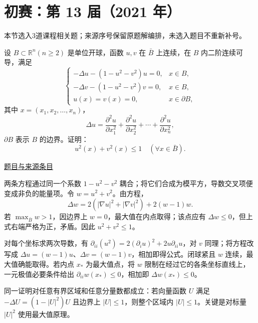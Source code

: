 \documentclass[UTF8,12pt,a4paper,fontset=fandol]{ctexart}
\begin{document}
\section{初赛：第 13 届（2021 年）}

本节选入3道课程相关题；来源序号保留原题解编排，未选入题目不重新补号。

\begin{example}[来源序号2]\label{ex:ch07-13th-A:2}\label{pr:ch07-13th-A:2}

设 $B\subset\mathbb R^{n}(n\geq 2)$ 是单位开球，函数 $u,v$ 在 $\bar{B}$ 上连续，在 $B$ 内二阶连续可导，满足
\[
\begin{cases}-\Delta u-\left(1-u^{2}-v^{2}\right)u=0, & x\in B,\\ -\Delta v-\left(1-u^{2}-v^{2}\right)v=0, & x\in B,\\ u(x)=v(x)=0, & x\in\partial B,\end{cases}
\]
其中 $x=\left(x_{1},x_{2},\ldots,x_{n}\right)$，
\[
\Delta u=\frac{\partial^{2}u}{\partial x_{1}^{2}}+\frac{\partial^{2}u}{\partial x_{2}^{2}}+\cdots+\frac{\partial^{2}u}{\partial x_{n}^{2}},
\]
$\partial B$ 表示 $B$ 的边界。证明：
\[
u^{2}(x)+v^{2}(x)\leq 1\quad(\forall x\in\bar{B}).
\]

\par\href{https://github.com/lzxcr/cmc-mathematics/blob/64916fa1fdbc3e444a652eca204d5669058ee321/src/problems/preliminary/13/02.md}{题目与来源条目}

\end{example}

\begin{solve}\label{ans:ch07-13th-A:2}

两条方程通过同一个系数 $1-u^2-v^2$ 耦合；将它们合成为模平方，导数交叉项便变成非负的能量项。令 $w=u^2+v^2$。由方程，
\[
\Delta w=2(|\nabla u|^2+|\nabla v|^2)+2(w-1)w.
\]
若 $\max_{\bar B}w>1$，因边界上 $w=0$，最大值在内点取得；该点应有 $\Delta w\leq0$，但上式右端严格为正，矛盾。因此 $u^2+v^2\leq1$。

对每个坐标求两次导数，有 $\partial_{ii}(u^2)=2(\partial_i u)^2+2u\partial_{ii}u$，对 $v$ 同理；将方程改写成 $\Delta u=(w-1)u$、$\Delta v=(w-1)v$，相加即得公式。闭球紧且 $w$ 连续，最大值确能取得。若内点 $x_*$ 为最大值点，将 $w$ 限制在经过它的各条坐标直线上，一元极值必要条件给出 $\partial_{ii}w(x_*)\le0$，相加即 $\Delta w(x_*)\le0$。

\end{solve}

\begin{remark}[方法与条件]同一证明对任意有界区域和任意分量数都成立：若向量函数 $U$ 满足 $-\Delta U=(1-|U|^2)U$ 且边界上 $|U|\leq1$，则整个区域内 $|U|\leq1$。关键是对标量 $|U|^2$ 使用最大值原理。\end{remark}
\end{document}
